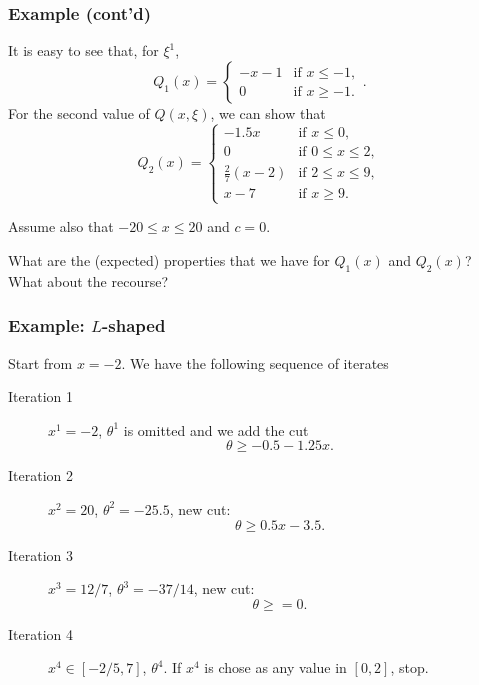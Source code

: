 \documentclass{beamer}
\begin{document}
\begin{frame}
\frametitle{Example (cont'd)}

It is easy to see that, for $\xi^1$,
\[
Q_1(x) = \begin{cases}
-x-1 & \mbox{if } x \leq -1, \\ 0 & \mbox{if } x \geq -1.
\end{cases}.
\]
For the second value of $Q(x,\xi)$, we can show that
\[
Q_2(x) = \begin{cases}
-1.5x & \mbox{if } x \leq 0, \\
0 & \mbox{if } 0 \leq x \leq 2, \\
\frac{2}{7}(x-2) & \mbox{if } 2 \leq x \leq 9, \\
x - 7 & \mbox{if } x \geq 9.
\end{cases}
\]

Assume also that $-20 \leq x \leq 20$ and $c = 0$.

\mbox{}

What are the (expected) properties that we have for $Q_1(x)$ and
$Q_2(x)$?\\
What about the recourse?

\end{frame}

\begin{frame}
\frametitle{Example: $L$-shaped}

Start from $x = -2$. We have the following sequence of iterates
\begin{description}
\item[Iteration 1] $x^1 = -2$, $\theta^1$ is omitted and we add the cut
\[
\theta \geq -0.5 -1.25x.
\]
\item[Iteration 2] $x^2 = 20$, $\theta^2 = -25.5$, new cut:
\[
\theta \geq 0.5x - 3.5.
\]
\item[Iteration 3] $x^3 = 12/7$, $\theta^3 = -37/14$, new cut:
\[
\theta \geq= 0.
\]
\item[Iteration 4] $x^4 \in [-2/5, 7]$, $\theta^4$.
If $x^4$ is chose as any value in $[0,2]$, stop.
\end{description}

\end{frame}
\end{document}
